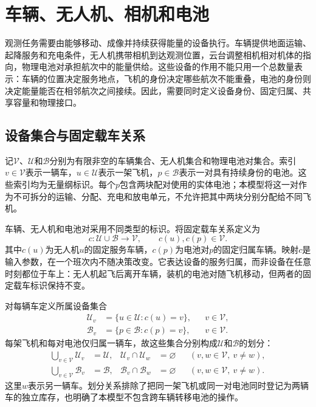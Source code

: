 \section{车辆、无人机、相机和电池}
\label{sec:04_02}

观测任务需要由能够移动、成像并持续获得能量的设备执行。车辆提供地面运输、起降服务和充电条件，无人机携带相机到达观测位置，云台调整相机相对机体的指向，物理电池对承担航次中的能量供给。这些设备的作用不能只用一个总数量表示：车辆的位置决定服务地点，飞机的身份决定哪些航次不能重叠，电池的身份则决定能量能否在相邻航次之间接续。因此，需要同时定义设备身份、固定归属、共享容量和物理接口。

\subsection{设备集合与固定载车关系}

记$\mathcal V$、$\mathcal U$和$\mathcal B$分别为有限非空的车辆集合、无人机集合和物理电池对集合。索引$v\in\mathcal V$表示一辆车，$u\in\mathcal U$表示一架飞机，$p\in\mathcal B$表示一对具有持续身份的电池。这些索引均为无量纲标识。每个$p$包含两块配对使用的实体电池；本模型将这一对作为不可拆分的运输、分配、充电和放电单元，不允许把其中两块分别分配给不同飞机。

车辆、无人机和电池对采用不同类型的标识。将固定载车关系定义为
\begin{equation}
 c:\mathcal U\cup\mathcal B\longrightarrow\mathcal V,
 \qquad c(u),c(p)\in\mathcal V.
 \label{s0402:carrier_mapping}
\end{equation}
其中$c(u)$为无人机$u$的固定服务车辆，$c(p)$为电池对$p$的固定归属车辆。映射$c$是输入参数，在一个班次内不随决策改变。它表达设备的服务归属，而非设备在任意时刻都位于车上：无人机起飞后离开车辆，装机的电池对随飞机移动，但两者的固定载车标识保持不变。

对每辆车定义所属设备集合
\begin{align}
 \mathcal U_v&=\{u\in\mathcal U:c(u)=v\},
 &&v\in\mathcal V,
 \label{s0402:vehicle_aircraft}\\
 \mathcal B_v&=\{p\in\mathcal B:c(p)=v\},
 &&v\in\mathcal V.
 \label{s0402:vehicle_batteries}
\end{align}
每架飞机和每对电池仅归属一辆车，故这些集合分别构成$\mathcal U$和$\mathcal B$的划分：
\begin{align}
 \bigcup_{v\in\mathcal V}\mathcal U_v&=\mathcal U,
 &\mathcal U_v\cap\mathcal U_w&=\varnothing
 &&(v,w\in\mathcal V,\ v\ne w),
 \label{s0402:aircraft_partition}\\
 \bigcup_{v\in\mathcal V}\mathcal B_v&=\mathcal B,
 &\mathcal B_v\cap\mathcal B_w&=\varnothing
 &&(v,w\in\mathcal V,\ v\ne w).
 \label{s0402:battery_partition}
\end{align}
这里$w$表示另一辆车。划分关系排除了把同一架飞机或同一对电池同时登记为两辆车的独立库存，也明确了本模型不包含跨车辆转移电池的操作。

